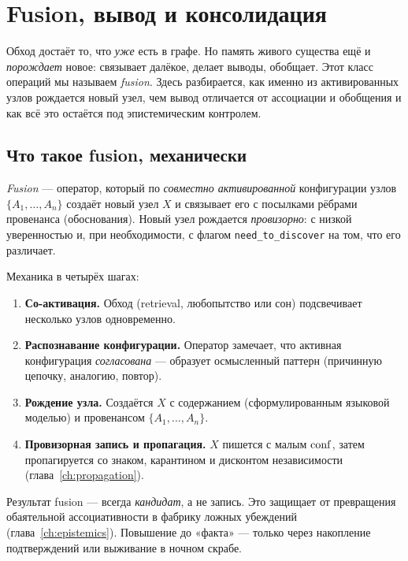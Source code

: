\chapter{Fusion, вывод и консолидация}
\label{ch:fusion}

Обход достаёт то, что \emph{уже} есть в графе. Но память живого существа ещё и
\emph{порождает} новое: связывает далёкое, делает выводы, обобщает. Этот класс
операций мы называем \emph{fusion}. Здесь разбирается, как именно из активированных
узлов рождается новый узел, чем вывод отличается от ассоциации и обобщения и как всё
это остаётся под эпистемическим контролем.

\section{Что такое fusion, механически}

\begin{definition}
\emph{Fusion} — оператор, который по \emph{совместно активированной} конфигурации
узлов $\{A_1,\dots,A_n\}$ создаёт новый узел $X$ и связывает его с посылками рёбрами
провенанса (обоснования). Новый узел рождается \emph{провизорно}: с низкой
уверенностью и, при необходимости, с флагом \texttt{need\_to\_discover} на том, что
его различает.
\end{definition}

Механика в четырёх шагах:
\begin{enumerate}
\item \textbf{Со-активация.} Обход (retrieval, любопытство или сон) подсвечивает
несколько узлов одновременно.
\item \textbf{Распознавание конфигурации.} Оператор замечает, что активная
конфигурация \emph{согласована} — образует осмысленный паттерн (причинную цепочку,
аналогию, повтор).
\item \textbf{Рождение узла.} Создаётся $X$ с содержанием (сформулированным
языковой моделью) и провенансом $\{A_1,\dots,A_n\}$.
\item \textbf{Провизорная запись и пропагация.} $X$ пишется с малым $\mathrm{conf}$, затем
пропагируется со знаком, карантином и дисконтом независимости
(глава~\ref{ch:propagation}).
\end{enumerate}

\begin{principle}
Результат fusion — всегда \emph{кандидат}, а не запись. Это защищает от превращения
обаятельной ассоциативности в фабрику ложных убеждений
(глава~\ref{ch:epistemics}). Повышение до «факта» — только через накопление
подтверждений или выживание в ночном скрабе.
\end{principle}

